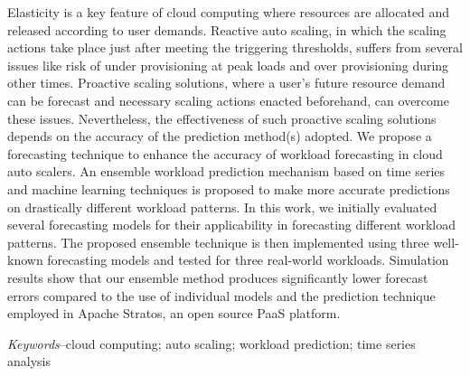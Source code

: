 Elasticity is a key feature of cloud computing where resources are allocated and released according to user demands. Reactive auto scaling, in which the scaling actions take place just after meeting the triggering thresholds, suffers from several issues like risk of under provisioning at peak loads and over provisioning during other times. Proactive scaling solutions, where a user's future resource demand can be forecast and necessary scaling actions enacted beforehand, can overcome these issues. Nevertheless, the effectiveness of such proactive scaling solutions depends on the accuracy of the prediction method(s) adopted. We propose a forecasting technique to enhance the accuracy of workload forecasting in cloud auto scalers. An ensemble workload prediction mechanism based on time series and machine learning techniques is proposed to make more accurate predictions on drastically different workload patterns. In this work, we initially evaluated several forecasting models for their applicability in forecasting different workload patterns. The proposed ensemble technique is then implemented using three well-known forecasting models and tested for three real-world workloads. Simulation results show that our ensemble method produces significantly lower forecast errors compared to the use of individual models and the prediction technique employed in Apache Stratos, an open source PaaS platform.

\textit{Keywords}--cloud computing; auto scaling; workload prediction; time series analysis
